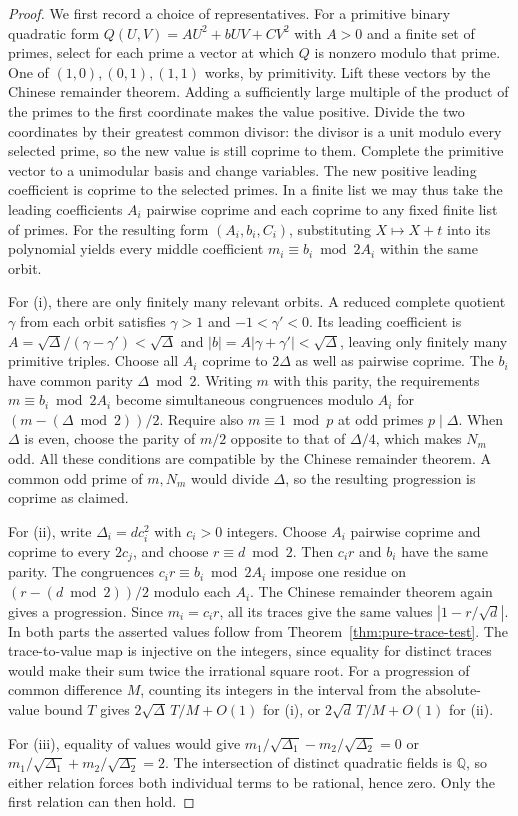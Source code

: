 \documentclass[11pt]{amsart}
\theoremstyle{definition}
\theoremstyle{remark}
\numberwithin{equation}{section}
\newcommand{\Q}{\mathbb{Q}}
\begin{document}
\begin{proof}
We first record a choice of representatives. For a primitive
binary quadratic form $Q(U,V)=A U^2+bUV+CV^2$ with $A>0$
and a finite set of primes, select for each prime a vector at which
$Q$ is nonzero modulo that prime. One of $(1,0),(0,1),(1,1)$ works,
by primitivity. Lift these vectors by the Chinese remainder theorem.
Adding a sufficiently large multiple of the product of the primes
to the first coordinate makes the value positive. Divide the two
coordinates by their greatest common divisor: the divisor is a
unit modulo every selected prime, so the new value is still
coprime to them. Complete the primitive vector to a unimodular
basis and change variables. The new positive leading coefficient
is coprime to the selected primes. In a finite list we may thus
take the leading coefficients $A_i$ pairwise coprime and each
coprime to any fixed finite list of primes. For the resulting
form $(A_i,b_i,C_i)$, substituting $X\mapsto X+t$ into its
polynomial yields every middle coefficient
$m_i\equiv b_i\bmod 2A_i$ within the same orbit.

For (i), there are only finitely many relevant orbits.
A reduced complete quotient $\gamma$ from each orbit satisfies
$\gamma>1$ and $-1<\gamma'<0$. Its leading coefficient is
$A=\sqrt\Delta/(\gamma-\gamma')<\sqrt\Delta$ and
$|b|=A|\gamma+\gamma'|<\sqrt\Delta$, leaving only finitely
many primitive triples. Choose all $A_i$ coprime to $2\Delta$
as well as pairwise coprime. The $b_i$ have common parity
$\Delta\bmod2$. Writing $m$ with this parity, the requirements
$m\equiv b_i\bmod 2A_i$ become simultaneous congruences
modulo $A_i$ for $(m-(\Delta\bmod2))/2$.
Require also $m\equiv1\bmod p$ at odd primes $p\mid\Delta$.
When $\Delta$ is even, choose the parity of $m/2$ opposite
to that of $\Delta/4$, which makes $N_m$ odd.
All these conditions are compatible by the Chinese remainder
theorem. A common odd prime of $m,N_m$ would divide $\Delta$,
so the resulting progression is coprime as claimed.

For (ii), write $\Delta_i=d c_i^2$ with $c_i>0$ integers.
Choose $A_i$ pairwise coprime and coprime to every $2c_j$,
and choose $r\equiv d\bmod2$.
Then $c_i r$ and $b_i$ have the same parity. The congruences
$c_i r\equiv b_i\bmod 2A_i$ impose one residue on
$(r-(d\bmod2))/2$ modulo each $A_i$. The Chinese remainder theorem
again gives a progression. Since $m_i=c_i r$, all its traces
give the same values $|1-r/\sqrt d|$.
In both parts the asserted values follow from
Theorem~\ref{thm:pure-trace-test}. The trace-to-value map is
injective on the integers, since equality for distinct traces
would make their sum twice the irrational square root.
For a progression of common difference $M$, counting its
integers in the interval from the absolute-value bound $T$
gives $2\sqrt\Delta\,T/M+O(1)$ for (i), or
$2\sqrt d\,T/M+O(1)$ for (ii).

For (iii), equality of values would give
$m_1/\sqrt{\Delta_1}-m_2/\sqrt{\Delta_2}=0$
or $m_1/\sqrt{\Delta_1}+m_2/\sqrt{\Delta_2}=2$.
The intersection of distinct quadratic fields is $\Q$,
so either relation forces both individual terms to be rational,
hence zero. Only the first relation can then hold.
\end{proof}
\end{document}
